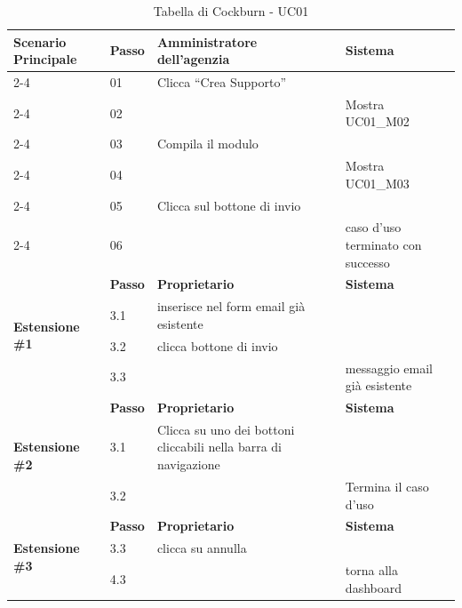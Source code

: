 \documentclass{article}
\begin{document}
\begin{table}[htbp]
\begin{tabular}{|p{3cm}|l|p{4.5cm}|p{4.5cm}|}
\hline
\multirow{6}{3cm}{\textbf{Scenario Principale}} 
   & \textbf{Passo} & \textbf{Amministratore dell'agenzia} & \textbf{Sistema} \\ \cline{2-4}
   & 01 & Clicca ``Crea Supporto'' & \\ \cline{2-4}
   & 02 & & Mostra UC01\_M02 \\ \cline{2-4}
   & 03 & Compila il modulo & \\ \cline{2-4}
   & 04 & & Mostra UC01\_M03 \\ \cline{2-4}
   & 05 & Clicca sul bottone di invio & \\ \cline{2-4}
   & 06 & & caso d'uso terminato con successo \\ \hline
\multirow{4}{3cm}{\textbf{Estensione \#1}} 
   & \textbf{Passo} & \textbf{Proprietario} & \textbf{Sistema} \\ \cline{2-4}
   & 3.1 & inserisce nel form email già esistente & \\ \cline{2-4}
   & 3.2 & clicca bottone di invio &  \\ \hline
   & 3.3 & & messaggio email già esistente \\ \hline
\multirow{3}{3cm}{\textbf{Estensione \#2}} 
   & \textbf{Passo} & \textbf{Proprietario} & \textbf{Sistema} \\ \cline{2-4}
   & 3.1 & Clicca su uno dei bottoni \newline cliccabili nella barra di navigazione
 & \\ \cline{2-4}
   & 3.2 & & Termina il caso d’uso \\ \hline
   \multirow{3}{3cm}{\textbf{Estensione \#3}} 
   & \textbf{Passo} & \textbf{Proprietario} & \textbf{Sistema} \\ \cline{2-4}
   & 3.3 & clicca su annulla & \\ \cline{2-4}
   & 4.3 & & torna alla dashboard \\ \hline
   
\end{tabular}

\caption{Tabella di Cockburn - UC01}
\end{table}
\end{document}
